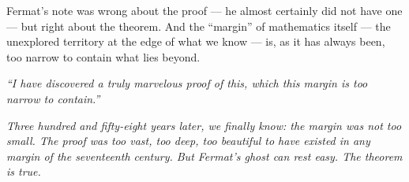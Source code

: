 Fermat's note was wrong about the proof --- he almost certainly did not have one --- but right about the theorem. And the ``margin'' of mathematics itself --- the unexplored territory at the edge of what we know --- is, as it has always been, too narrow to contain what lies beyond.



\emph{``I have discovered a truly marvelous proof of this, which this margin is too narrow to contain.''}

\emph{Three hundred and fifty-eight years later, we finally know: the margin was not too small. The proof was too vast, too deep, too beautiful to have existed in any margin of the seventeenth century. But Fermat's ghost can rest easy. The theorem is true.}
